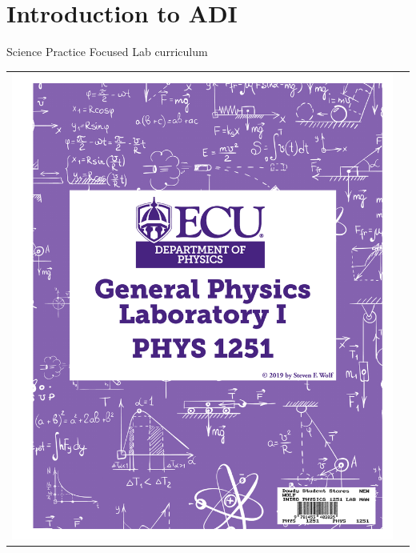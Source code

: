 \documentclass[xcolor=dvipsnames,table]{beamer}
\begin{document}
\section{Introduction to ADI}
\begin{frame}{Science Practice Focused Lab curriculum}
  \begin{tabular}{cc}
    \includegraphics[height=0.6\textheight]{./clipart/p1251cover.pdf}

\end{tabular}
\end{frame}
\end{document}
